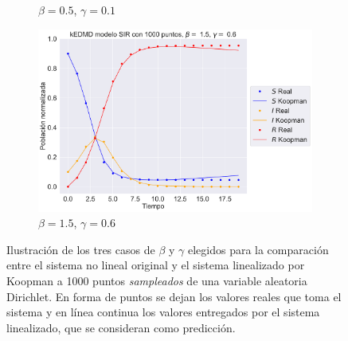 \begin{figure}[htbp]
\begin{subfigure}[b]{0.45\textwidth}
        \caption{$\beta=0.5$, $\gamma = 0.1$}
        \label{fig:image2}
    \end{subfigure}
    \hfill
    \begin{subfigure}[b]{0.45\textwidth}
        \centering
        \includegraphics[width=\textwidth]{img/content/chapter3/SIR3.pdf}
        \caption{$\beta=1.5$, $\gamma = 0.6$}
    \end{subfigure}
    \caption{Ilustración de los tres casos de $\beta$ y $\gamma$ elegidos para la comparación entre el sistema no lineal original y el sistema linealizado por Koopman a 1000 puntos \textit{sampleados} de una variable aleatoria Dirichlet. En forma de puntos se dejan los valores reales que toma el sistema y en línea continua los valores entregados por el sistema linealizado, que se consideran como predicción.}
    \label{fig:Comp_traj_SIR}
\end{figure}

